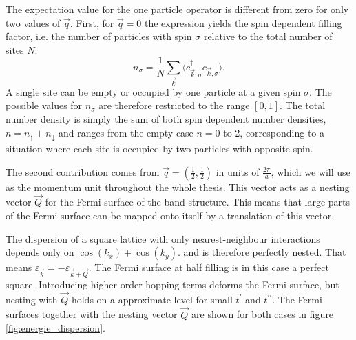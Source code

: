 The expectation value for the one particle operator is different from zero for only two values of $\vec q$.
First, for $\vec q = 0$ the expression yields the spin dependent filling factor, i.e. the number of particles with spin $\sigma$ relative to the total number of sites $N$.
\begin{equation}
 n_{\sigma} = \frac1N \sum_{\vec k} \langle c^{\dagger}_{\vec k, \sigma} c_{\vec k, \sigma} \rangle.
\end{equation}
A single  site can be empty or occupied by one particle at a given spin $\sigma$. The possible values for $n_{\sigma}$ are therefore restricted to the range $[0,1]$.
The total number density is simply the sum of both spin dependent number densities, $n=n_{\uparrow}+n_{\downarrow}$ 
and ranges from the empty case $n=0$ to 2, corresponding to a situation where each site is occupied by two particles with opposite spin.


The second contribution comes from $\vec q = (\frac12, \frac12)$ in units of $\frac{2\pi}a$, which we will use as the momentum unit throughout the whole thesis.
This vector acts as a nesting vector $\vec Q$ for the Fermi surface of the band structure. 
This means that large parts of the Fermi surface can be mapped onto itself by a translation of this vector. 

The dispersion of a square lattice with only nearest-neighbour interactions 
%
depends only on $\cos(k_x) + \cos(k_y)$.
and is therefore perfectly nested.
That means
$\varepsilon_{\vec k} = -\varepsilon_{\vec k + \vec Q}$.
The Fermi surface at half filling is in this case a perfect square.
Introducing higher order hopping terms deforms the Fermi surface, but nesting with $\vec Q$ holds on a approximate level for small $t^{\prime}$ and $t^{\prime \prime}$.
The Fermi surfaces together with the nesting vector $\vec Q$ are shown for both cases in figure \ref{fig:energie_dispersion}.
%
%
%



